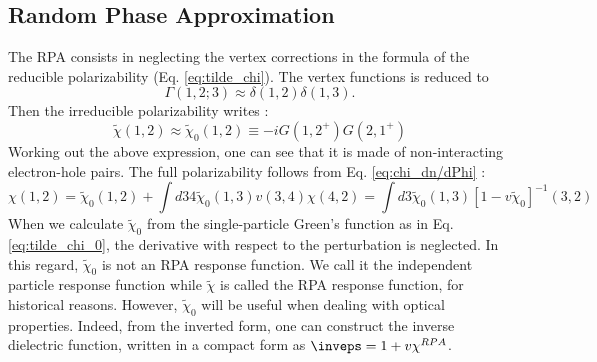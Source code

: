 \subsection{Random Phase Approximation} 
The \gls{RPA} consists in neglecting the vertex corrections in the formula of the reducible polarizability (Eq. \eqref{eq:tilde_chi}). The vertex functions is reduced to 
\begin{equation}
	\Gamma(1,2;3) \approx \delta(1,2)\delta(1,3).
\end{equation}
Then the irreducible polarizability writes :
\begin{equation}
	\tilde{\chi}(1,2) \approx \tilde{\chi}_0(1,2) \equiv -i G(1,2^+)G(2,1^+) \label{eq:tilde_chi_0}
\end{equation}
Working out the above expression, one can see that it is made of non-interacting electron-hole pairs. The full polarizability follows from Eq. \eqref{eq:chi_dn/dPhi} :
\begin{equation}
	\chi(1,2) = \tilde{\chi}_0(1,2) + \int d34 \tilde{\chi}_0(1,3) v(3,4) \chi(4,2) = \int d3 \tilde{\chi}_0(1,3) \left[ 1 - v \tilde{\chi}_0\right]^{-1}(3,2)
\end{equation}
When we calculate $\tilde{\chi}_0$ from the single-particle Green's function as in Eq. \eqref{eq:tilde_chi_0}, the derivative with respect to the perturbation is neglected. In this regard, $\tilde{\chi}_0$ is not an \gls{RPA} response function. We call it the independent particle response function while $\tilde{\chi}$ is called the RPA response function, for historical reasons.
However, $\tilde{\chi}_0$ will be useful when dealing with optical properties. Indeed, from the inverted form, one can construct the inverse dielectric function, written in a compact form as $\inveps = 1+v \chi^{RPA}$.

%

